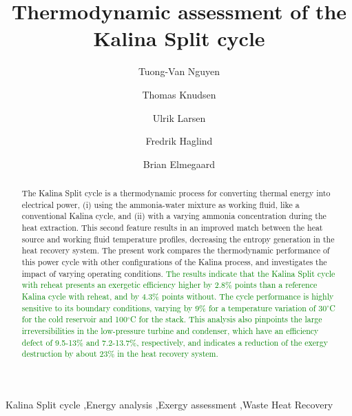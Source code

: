 \documentclass[final,times,3p]{elsarticle}
\begin{document}
\begin{frontmatter}

\title{Thermodynamic assessment of the Kalina Split cycle}

\author[]{Tuong-Van Nguyen}  
\author[]{Thomas Knudsen} 
\author[]{Ulrik Larsen} 
\author[]{Fredrik Haglind} 
\author[]{Brian Elmegaard}

\address{Section of Thermal Energy, Department of Mechanical Engineering, Technical University of Denmark,\\ Building 403, Nils Koppels All\'{e}, 2800 Kongens Lyngby, Denmark}

\begin{abstract}

The Kalina Split cycle is a thermodynamic process for converting thermal energy into electrical power, (i) using the ammonia-water mixture as working fluid, like a conventional Kalina cycle, and (ii) with a varying ammonia concentration during the heat extraction. This second feature results in an improved match between the heat source and working fluid temperature profiles, decreasing the entropy generation in the heat recovery system.  
The present work compares the thermodynamic performance of this power cycle with other configurations of the Kalina process, and investigates the impact of varying operating conditions. \textcolor{green}{The results indicate that the Kalina Split cycle with reheat presents an exergetic efficiency higher by 2.8\% points than a reference Kalina cycle with reheat, and by 4.3\% points without. The cycle performance is highly sensitive to its boundary conditions, varying by 9\% for a temperature variation of 30$^{\circ}$C for the cold reservoir and 100$^{\circ}$C for the stack. This analysis also pinpoints the large irreversibilities in the low-pressure turbine and condenser, which have an efficiency defect of 9.5-13\% and 7.2-13.7\%, respectively, and indicates a reduction of the exergy destruction by about 23\% in the heat recovery system.} 

\end{abstract}

\begin{keyword}
Kalina Split cycle \sep Energy analysis \sep Exergy assessment \sep Waste Heat Recovery 
\end{keyword}

\end{frontmatter}
\end{document}
